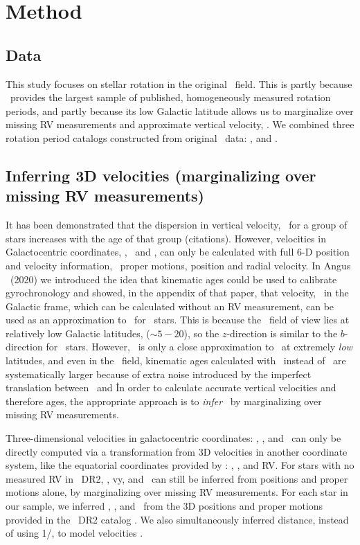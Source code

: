 \section{Method}

\subsection{Data}
\label{sec:data}

This study focuses on stellar rotation in the original \kepler\ field.
This is partly because \kepler\ provides the largest sample of published,
homogeneously measured rotation periods, and partly because its low Galactic
latitude allows us to marginalize over missing RV measurements and approximate
vertical velocity, \vz.
We combined three rotation period catalogs constructed from original \kepler\
data: \citet{mcquillan2014}, \citet{santos2019} and \citet{garcia2014}.

\subsection{Inferring 3D velocities (marginalizing over missing RV
measurements)}
\label{sec:velocity_inference}

It has been demonstrated that the dispersion in vertical velocity, \vz\, for a
group of stars increases with the age of that group (citations).
However, velocities in Galactocentric coordinates, \vx, \vy\ and \vz, can only
be calculated with full 6-D position and velocity information, \ie\ proper
motions, position and radial velocity.
In Angus \etal\ (2020) we introduced the idea that kinematic ages could be
used to calibrate gyrochronology and showed, in the appendix of that paper,
that velocity, \vb\ in the Galactic frame, which can be calculated without an
RV measurement, can be used as an approximation to \vz\ for \kepler\ stars.
This is because the \kepler\ field of view lies at relatively low Galactic
latitudes, ($\sim 5-20$\degrees), so the $z$-direction is similar to the
$b$-direction for \kepler\ stars.
However, \vb\ is only a close approximation to \vz\ at extremely {\it low}
latitudes, and even in the \kepler\ field, kinematic ages calculated with \vb\
instead of \vz\ are systematically larger because of extra noise introduced by
the imperfect translation between \vb\ and \vz\.
In order to calculate accurate vertical velocities and therefore ages, the
appropriate approach is to {\it infer} \vz\  by marginalizing over missing RV
measurements.

Three-dimensional velocities in galactocentric coordinates: \vx, \vy, and \vz\
can only be directly computed via a transformation from 3D velocities in
another coordinate system, like the equatorial coordinates provided by \gaia:
\mura, \mudec, and RV.
For stars with no measured RV in \gaia\ DR2, \vx, vy, and \vz\ can still be
inferred from positions and proper motions alone, by marginalizing over
missing RV measurements.
For each star in our sample, we inferred \vx, \vy, and \vz\ from the 3D
positions and proper motions provided in the \gaia\ DR2 catalog
\citep{brown2011}.
We also simultaneously inferred distance, instead of using 1/\parallax, to
model velocities \citep{bailer-jones2015, bailer-jones2018}.

